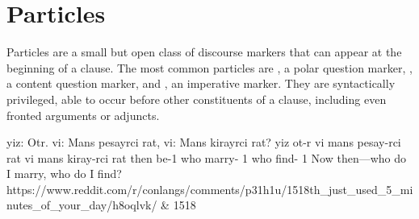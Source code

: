 \setchapterpreamble[u]{\margintoc}
\chapter{Particles}
Particles are a small but open class of discourse markers that can appear at the beginning of a clause. The most common particles are , a polar question marker, , a content question marker, and , an imperative marker. They are syntactically privileged, able to occur before other constituents of a clause, including even fronted arguments or adjuncts.

\begin{example*}
    \script yiz: Otr. vi: Mans pesayrci rat, vi: Mans kirayrci rat?
    \bits  yiz ot-r vi mans pesay-rci rat vi mans kiray-rci rat
    \gloss then be-{1}  who marry- {1}  who find- {1}
    \tr Now then---who do I marry, who do I find?
    \smoyd https://www.reddit.com/r/conlangs/comments/p31h1u/1518th_just_used_5_minutes_of_your_day/h8oqlvk/ & 1518
\end{example*}  





